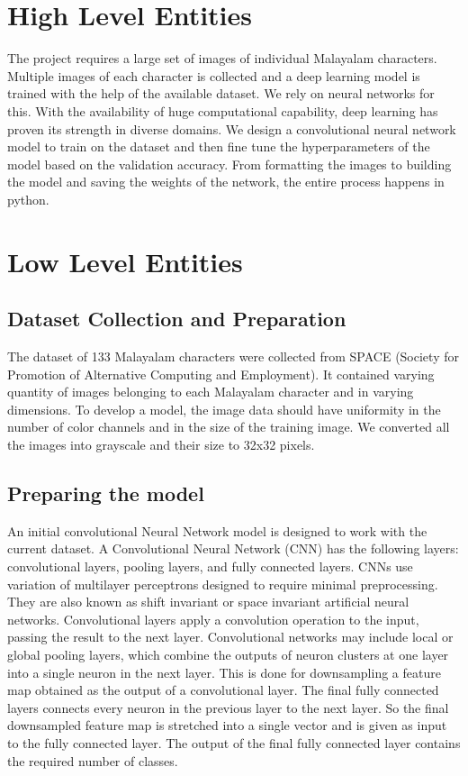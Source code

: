\documentclass[12pt]{report}
\begin{document}
\section*{High Level Entities}
The project requires a large set of images of individual Malayalam characters. Multiple images of each character is collected and a deep learning model is trained with the help of the available dataset. We rely on neural networks for this. With the availability of huge computational capability, deep learning has proven its strength in diverse domains. We design a convolutional neural network model to train on the dataset and then fine tune the hyperparameters of the model based on the validation accuracy. From formatting the images to building the model and saving the weights of the network, the entire process happens in python. 

\section*{Low Level Entities}
\subsection*{Dataset Collection and Preparation}
The dataset of 133 Malayalam characters were collected from SPACE (Society for Promotion of Alternative Computing and Employment). It contained varying quantity of images belonging to each Malayalam character and in varying dimensions. To develop a model, the image data should have uniformity in the number of color channels and in the size of the training image. We converted all the images into grayscale and their size to 32x32 pixels. 

\subsection*{Preparing the model}
An initial convolutional Neural Network model is designed to work with the current dataset. A Convolutional Neural Network (CNN) has the following  layers: convolutional layers, pooling layers, and fully connected layers. CNNs use variation of multilayer perceptrons designed to require minimal preprocessing. They are also known as shift invariant or space invariant artificial neural networks. Convolutional layers apply a convolution operation to the input, passing the result to the next layer. Convolutional networks may include local or global pooling layers, which combine the outputs of neuron clusters at one layer into a single neuron in the next layer. This is done for downsampling a feature map obtained as the output of a convolutional layer. The final fully connected layers connects every neuron in the previous layer to the next layer. So the final downsampled feature map is stretched into a single vector and is given as input to the fully connected layer. The output of the final fully connected layer contains the required number of classes.
\end{document}
